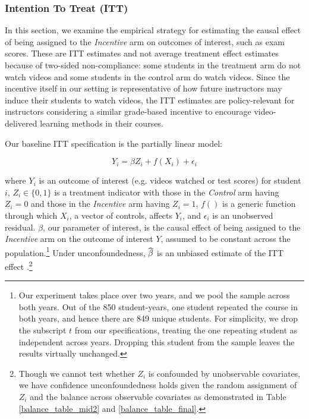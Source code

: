 \documentclass[12pt]{article}
\newcommand\wh[1]{\hstretch{2}{\hat{\hstretch{.5}{#1}}}}
\begin{document}
\subsubsection{Intention To Treat (ITT)}

In this section, we examine the empirical strategy for estimating the causal effect of being assigned to the \textit{Incentive} arm on outcomes of interest, such as exam scores. These are ITT estimates and not average treatment effect estimates because of two-sided non-compliance: some students in the treatment arm do not watch videos and some students in the control arm do watch videos. Since the incentive itself in our setting is representative of how future instructors may induce their students to watch videos, the ITT estimates are policy-relevant for instructors considering a similar grade-based incentive to encourage video-delivered learning methods in their courses.

Our baseline ITT specification is the partially linear model:

\begin{equation} \label{itt_spec}
	Y_i = \beta Z_i + f(X_i) + \epsilon_i
\end{equation}

where $Y_i$ is an outcome of interest (e.g. videos watched or test scores) for student $i$, $Z_i \in \{0,1\}$ is a treatment indicator with those in the \textit{Control} arm having $Z_i=0$ and those in the \textit{Incentive} arm having $Z_i=1$, $f()$ is a generic function through which $X_i$, a vector of controls, affects $Y_i$, and $\epsilon_i$ is an unobserved residual. $\beta$, our parameter of interest, is the causal effect of being assigned to the \textit{Incentive} arm on the outcome of interest $Y$, assumed to be constant across the population.\footnote{Our experiment takes place over two years, and we pool the sample across both years. Out of the 850 student-years, one student repeated the course in both years, and hence there are 849 unique students. For simplicity, we drop the subscript $t$ from our specifications, treating the one repeating student as independent across years. Dropping this student from the sample leaves the results virtually unchanged.} Under unconfoundedness, $\wh{\beta}$ is an unbiased estimate of the ITT effect \parencite{ir2015}.\footnote{Though we cannot test whether $Z_i$ is confounded by unobservable covariates, we have confidence unconfoundedness holds given the random assignment of $Z_i$ and the balance across observable covariates as demonstrated in Table \ref{balance_table_mid2} and \ref{balance_table_final}.}
\end{document}
